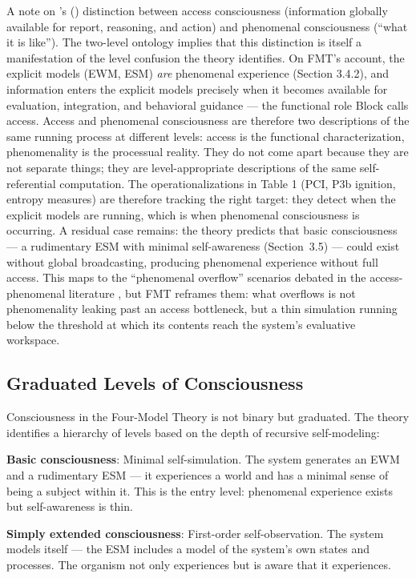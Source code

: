\documentclass[12pt]{article}
\newcommand{\rev}[1]{#1}
\begin{document}
A note on \rev{\citeauthor{Block1995}'s (\citeyear{Block1995})} distinction between access consciousness (information globally available for report, reasoning, and action) and phenomenal consciousness (``what it is like''). The two-level ontology implies that this distinction is itself a manifestation of the level confusion the theory identifies. On FMT's account, the explicit models (EWM, ESM) \emph{are} phenomenal experience (Section 3.4.2), and information enters the explicit models precisely when it becomes available for evaluation, integration, and behavioral guidance --- the functional role Block calls access. Access and phenomenal consciousness are therefore two descriptions of the same running process at different levels: access is the functional characterization, phenomenality is the processual reality. They do not come apart because they are not separate things; they are level-appropriate descriptions of the same self-referential computation. The operationalizations in Table 1 (PCI, P3b ignition, entropy measures) are therefore tracking the right target: they detect when the explicit models are running, which is when phenomenal consciousness is occurring. A residual case remains: the theory predicts that basic consciousness --- a rudimentary ESM with minimal self-awareness (Section~3.5) --- could exist without global broadcasting, producing phenomenal experience without full access. This maps to the ``phenomenal overflow'' scenarios debated in the access-phenomenal literature \citep{Block2007}, but FMT reframes them: what overflows is not phenomenality leaking past an access bottleneck, but a thin simulation running below the threshold at which its contents reach the system's evaluative workspace.


\subsection{Graduated Levels of Consciousness}


Consciousness in the Four-Model Theory is not binary but graduated. The theory identifies a hierarchy of levels based on the depth of recursive self-modeling:

\textbf{Basic consciousness}: Minimal self-simulation. The system generates an EWM and a rudimentary ESM --- it experiences a world and has a minimal sense of being a subject within it. This is the entry level: phenomenal experience exists but self-awareness is thin.

\textbf{Simply extended consciousness}: First-order self-observation. The system models itself --- the ESM includes a model of the system's own states and processes. The organism not only experiences but is aware that it experiences.
\end{document}
